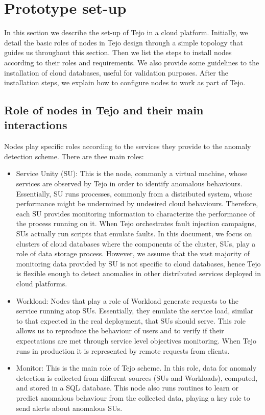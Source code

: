 \section{Prototype set-up}

In this section we describe the set-up of Tejo in a cloud platform. Initially, we detail the basic roles of nodes in Tejo design through a simple topology that guides us throughout this section. Then we list the steps to install nodes according to their roles and requirements. We also provide some guidelines to the installation of cloud databases, useful for validation purposes. After the installation steps, we explain how to configure nodes to work as part of Tejo.

\subsection{Role of nodes in Tejo and their main interactions}
\label{subsec:roles}

Nodes play specific roles according to the services they provide to the anomaly detection scheme. There are thee main roles:

\begin{itemize}
	\item Service Unity (SU): This is the node, commonly a virtual machine, whose services are observed by Tejo in order to identify anomalous behaviours. Essentially, SU runs processes, commonly from a distributed system, whose performance might be undermined by undesired cloud behaviours. Therefore, each SU provides monitoring information to characterize the performance of the process running on it. When Tejo orchestrates fault injection campaigns, SUs actually run scripts that emulate faults. In this document, we focus on clusters of cloud databases where the components of the cluster, SUs, play a role of data storage process. However, we assume that the vast majority of monitoring data provided by SU is not specific to cloud databases, hence Tejo is flexible enough to detect anomalies in other distributed services deployed in cloud platforms.
	\item Workload: Nodes that play a role of Workload generate requests to the service running atop SUs. Essentially, they emulate the service load, similar to that expected in the real deployment, that SUs should serve. This role allows us to reproduce the behaviour of users and to verify if their expectations are met through service level objectives monitoring. When Tejo runs in production it is represented by remote requests from clients. 
	\item Monitor: This is the main role of Tejo scheme. In this role, data for anomaly detection is collected from different sources (SUs and Workloads), computed, and stored in a SQL database. This node also runs routines to learn or predict anomalous behaviour from the collected data, playing a key role to send alerts about anomalous SUs. 
\end{itemize} 

